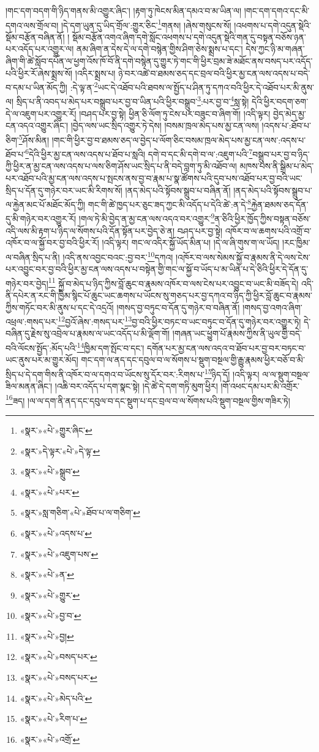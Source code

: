 །གང་དག་བདག་གི་ཉིད་གནས་མི་འགྱུར་ཞིང་། །རྟག་ཏུ་ཁེངས་མིན་དམའ་བ་མ་ཡིན་ལ། །གང་དག་དགའ་དང་མི་དགའ་ལས་གྲོལ་བ། །དེ་དག་ཡུན་དུ་ཡིད་གྲོལ་:གྱུར་ཅིང་\footnote{«སྣར་»«པེ་»གྱུར་ཞིང་}གནས། །ཞེས་གསུངས་སོ། །འཕགས་པ་དགེ་འདུན་སྡེའི་སྡོམ་བརྩོན་བཞིན་ནོ། །
སྡོམ་བརྩོན་འགའ་ཞིག་དགེ་སློང་འཕགས་པ་དགེ་འདུན་སྡེའི་གན་དུ་བསྟན་བཅོས་ཉན་པར་འདོད་པར་འགྱུར་ལ། ནམ་ཞིག་ན་དེས་དེ་ལ་དགེ་བསྙེན་གྱིས་ཤིག་ཅེས་སྨྲས་པ་དང་། དེས་ཀྱང་ཉི་མ་གཞན་ཞིག་གི་ཚེ་སློབ་དཔོན་ལ་ཕྱག་འོས་ཁོ་བོ་ནི་དགེ་བསྙེན་དུ་གྱུར་ཏེ་གང་གི་ཕྱིར་བྲམ་ཟེ་མཐོང་ནས་བསད་པར་འདོད་པའི་ཕྱིར་རོ་ཞེས་སྨྲས་སོ། །འདིར་སྨྲས་པ། ཉེ་བར་འཚེ་བ་ཐམས་ཅད་དང་བྲལ་བའི་ཕྱིར་མྱ་ངན་ལས་འདས་པ་བདེ་བ་དམ་པ་ཡིན་མོད་ཀྱི། :དེ་ལྟ་ན་\footnote{«སྣར་»དེ་ལྟར་«པེ་»དེ་ལྟ་}ཡང་དེ་འཐོབ་པའི་ཐབས་ལ་སྤྱོད་པ་ཤིན་ཏུ་དཀའ་བའི་ཕྱིར་དེ་འཐོབ་པར་མི་ནུས་ལ། སྲིད་པ་ནི་འབད་པ་མེད་པར་བསྒྲུབ་པར་བྱ་བ་ཡིན་པའི་ཕྱིར་བསྒྲུབ་\footnote{«སྣར་»«པེ་»སྒྲུབ་}:པར་བྱ་བ་\footnote{«སྣར་»«པེ་»པར་}སླ་སྟེ། དེའི་ཕྱིར་བདག་ཅག་དེ་ལ་འཇུག་པར་འགྱུར་རོ། །བཤད་པར་བྱ་སྟེ། ཕྱིན་ཅི་ལོག་ཏུ་ངེས་པར་བཟུང་བ་ཞིག་གོ། །འདི་ལྟར། བྱེད་མེད་མྱ་ངན་འདའ་འགྱུར་ཞིང་། །བྱེད་ལས་ཡང་སྲིད་འགྱུར་ཏེ་དེས། །བསམ་ཁྲལ་མེད་པས་མྱ་ངན་ལས། །འདས་པ་:ཐོབ་པ་ཅིག་\footnote{«སྣར་»སླ་གཅིག་«པེ་»ཐོབ་པ་ལ་གཅིག་}ཤོས་མིན། །གང་གི་ཕྱིར་བྱ་བ་ཐམས་ཅད་ལ་བྱེད་པ་ལོག་ཅིང་བསམ་ཁྲལ་མེད་པས་མྱ་ངན་ལས་:འདས་པ་ཐོབ་པ་\footnote{«སྣར་»«པེ་»འདས་པ་}དེའི་ཕྱིར་མྱ་ངན་ལས་འདས་པ་ཐོབ་པ་སླའི། དགེ་བ་དང་མི་དགེ་བ་ལ་:འཇུག་པའི་\footnote{«སྣར་»«པེ་»འཇུག་པས་}བསྒྲུབ་པར་བྱ་བ་ཉིད་ཀྱི་ཕྱིར་ན་མྱ་ངན་ལས་འདས་པ་ལས་ཅིག་ཤོས་ཡང་སྲིད་པ་ནི་བདེ་བླག་ཏུ་མི་འཐོབ་ལ། མཁས་པས་ནི་སྒྲིམ་པ་མེད་པར་འཐོབ་པའི་མྱ་ངན་ལས་འདས་པ་སྤངས་ནས་བྱ་བ་རྣམ་པ་སྣ་ཚོགས་པའི་དུབ་པས་འཐོབ་པར་བྱ་བའི་ཡང་སྲིད་པ་དོན་དུ་གཉེར་བར་ཡང་མི་རིགས་སོ། །ནད་མེད་པའི་སྟོབས་སྒྲུབ་པ་བཞིན་ནོ། །ནད་མེད་པའི་སྟོབས་སྒྲུབ་པ་ལ་རྐྱེན་མང་པོ་མཐོང་མོད་ཀྱི། གང་གི་ཚེ་ཁྱད་པར་ཅུང་ཟད་ཀྱང་མི་འདོད་པ་དེའི་ཚེ་:ན་དེ་\footnote{«སྣར་»«པེ་»ན་}རྐྱེན་ཐམས་ཅད་དོན་དུ་མི་གཉེར་བར་འགྱུར་རོ། །གལ་ཏེ་མི་བྱེད་ན་མྱ་ངན་ལས་འདའ་བར་འགྱུར་\footnote{«སྣར་»«པེ་»གྱུར་}ན་ཅིའི་ཕྱིར་ཁྱོད་ཀྱིས་བསྟན་བཅོས་འདི་ལས་མི་རྟག་པ་ཉིད་ལ་སོགས་པའི་དོན་སྟོན་པར་བྱེད་ཅེ་ན། བཤད་པར་བྱ་སྟེ། འཁོར་བ་ལ་ཆགས་པའི་འགྲོ་བ་འཁོར་བ་ལ་སྐྱོ་བར་བྱ་བའི་ཕྱིར་རོ། །འདི་ལྟར། གང་ལ་འདིར་སྐྱོ་ཡོད་མིན་པ། །དེ་ལ་ཞི་གུས་ག་ལ་ཡོད། །རང་ཁྱིམ་ལ་བཞིན་སྲིད་པ་ནི། །འདི་ནས་འབྱང་བའང་:བྱ་བར་\footnote{«སྣར་»«པེ་»བྱ་བ་}དཀའ། །འཁོར་བ་ལས་སེམས་སྐྱོ་བ་རྣམས་ནི་དེ་ལས་ངེས་པར་འབྱུང་བར་བྱ་བའི་ཕྱིར་མྱ་ངན་ལས་འདས་པ་བསྟེན་གྱི་གང་ལ་སྐྱོ་བ་ཡོད་པ་མ་ཡིན་པ་དེ་ཅིའི་ཕྱིར་དེ་དོན་དུ་གཉེར་བར་བྱེད།\footnote{«སྣར་»«པེ་»བྱ།} སྐྱོ་བ་མེད་པ་ཉིད་ཀྱིས་བློ་ཆུང་བ་རྣམས་འཁོར་བ་ལས་ངེས་པར་འབྱུང་བ་ཡང་མི་བཟོད་དེ། འདི་ནི་དཔེར་ན་རང་གི་ཁྱིམ་སྙིང་པོ་ཆུང་ཡང་ཆགས་པ་ཡོངས་སུ་གཅད་པར་བྱ་དཀའ་བ་ཉིད་ཀྱི་ཕྱིར་བློ་ཆུང་བ་རྣམས་ཀྱིས་གཏོང་བར་མི་ནུས་པ་དང་དེ་འདྲའོ། །གསད་བྱ་བཏུང་བ་དོན་དུ་གཉེར་བ་བཞིན་ནོ། །གསད་བྱ་འགའ་ཞིག་འཕྲལ་:གསད་པར་\footnote{«སྣར་»«པེ་»བསད་པར་}བྱའོ་ཞེས་:གསད་པར་\footnote{«སྣར་»«པེ་»བསད་པར་}བྱ་བའི་ཕྱིར་བཏང་བ་ཡང་བཏུང་བ་དོན་དུ་གཉེར་བར་འགྱུར་ཏེ། དེ་བཞིན་དུ་རྗེས་སུ་འབྲེལ་པ་རྣམས་ལ་ཡང་འདོད་པ་མི་ལྡོག་གོ། །གཞན་ཡང་ཕྱུག་པོ་རྣམས་ཀྱིས་ནི་ཡུལ་གྱི་བདེ་བའི་ལོངས་སྤྱོད་:མོད་པའི་\footnote{«སྣར་»«པེ་»མེད་པའི་}ཁྱིམ་དག་སྤོང་བ་དང་། དགོན་པར་མྱ་ངན་ལས་འདའ་བ་ཐོབ་པར་བྱ་བར་བཏང་བ་ཡང་ནུས་པར་མ་གྱུར་མོད། གང་དག་ལ་ནད་དང་དབུལ་བ་ལ་སོགས་པ་སྡུག་བསྔལ་གྱི་རྒྱུ་རྣམས་ཕྱིར་བཅོ་བ་མི་སྲིད་པ་དེ་དག་གིས་ནི་འཁོར་བ་ལ་དགའ་བ་ཡོངས་སུ་དོར་བར་:རིགས་པ་\footnote{«སྣར་»«པེ་»རིག་པ་}ཉིད་དོ། །འདི་ལྟར། ལ་ལ་སྡུག་བསྔལ་ཟིལ་མནན་ཞིང་། །འཆི་བར་འདོད་པ་དག་སྣང་སྟེ། །དེ་ཚེ་དེ་དག་གཏི་མུག་ཕྱིར། །གོ་འཕང་དམ་པར་མི་འགྲོར་\footnote{«སྣར་»«པེ་»འགྲོ་}ཟད། །ལ་ལ་དག་ནི་ནད་དང་དབུལ་བ་དང་སྡུག་པ་དང་བྲལ་བ་ལ་སོགས་པའི་སྡུག་བསྔལ་གྱིས་གཟིར་ཏེ། 